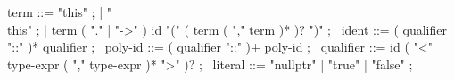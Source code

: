 \begin{syntax}
term ::= "this" ;
  | "\\this" ;
  | term ( "." | "->" ) id "(" ( term ( "," term )* )? ")" ;
\
ident ::= ( qualifier "::" )* qualifier ;
\
poly-id ::= ( qualifier "::" )+ poly-id ;
\
qualifier ::= id ( "<" type-expr ( "," type-expr )* ">" )? ;
\
literal ::= "nullptr" | "true" | "false" ;
\end{syntax}
